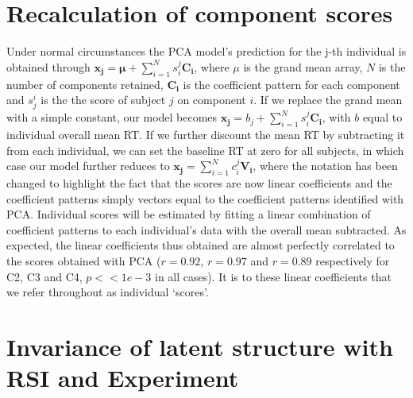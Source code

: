 \documentclass[12pt,letterpaper]{article}
\begin{document}
\clearpage

\section*{Recalculation of component scores}

Under normal circumstances the PCA model's prediction for the j-th individual is obtained through $\mathbf{x_j} = \bm{\mu} + \sum^N_{i=1} s_i^j \mathbf{C_i}$, where $\mu$ is the grand mean array, $N$ is the number of components retained, $\mathbf{C_i}$ is the coefficient pattern for each component and $s_j^i$ is the the score of subject $j$ on component $i$. If we replace the grand mean with a simple constant, our model becomes $\mathbf{x_j} = b_j + \sum^N_{i=1} s_i^j \mathbf{C_i}$, with $b$ equal to individual overall mean RT. If we further discount the mean RT by subtracting it from each individual, we can set the baseline RT at zero for all subjects, in which case our model further reduces to $\mathbf{x_j} = \sum^N_{i=1} c_i^j \mathbf{V_i}$, where the notation has been changed to highlight the fact that the scores are now linear coefficients and the coefficient patterns simply vectors equal to the coefficient patterns identified with PCA. Individual scores will be estimated by fitting a linear combination of coefficient patterns to each individual's data with the overall mean subtracted. As expected, the linear coefficients thus obtained are almost perfectly correlated to the scores obtained with PCA ($r = 0.92$, $r = 0.97$ and $r = 0.89$ respectively for C2, C3 and C4, $p << 1e-3$ in all cases). It is to these linear coefficients that we refer throughout as individual `scores'.


\clearpage

\section*{Invariance of latent structure with RSI and Experiment}
\end{document}
